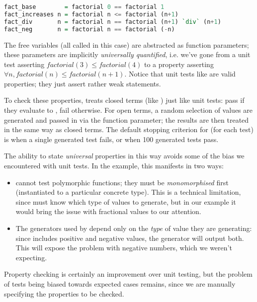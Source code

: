 \begin{lstlisting}[language=Haskell, xleftmargin=.2\textwidth, xrightmargin=.2\textwidth]
fact_base        = factorial 0 == factorial 1
fact_increases n = factorial n <= factorial (n+1)
fact_div       n = factorial n == factorial (n+1) `div` (n+1)
fact_neg       n = factorial n == factorial (-n)
\end{lstlisting}

The free variables (all called  in this case) are abstracted as function parameters; these parameters are implicitly \emph{universally quantified}, i.e. we've gone from a unit test asserting $factorial(3) \leq factorial(4)$ to a property asserting $\forall n, factorial(n) \leq factorial(n+1)$. Notice that unit tests like  are valid properties; they just assert rather weak statements.

To check these properties, \qcheck{} treats closed terms (like ) just like unit tests: pass if they evaluate to , fail otherwise. For open terms, a random selection of values are generated and passed in via the function parameter; the results are then treated in the same way as closed terms. The default stopping criterion for \qcheck{} (for each test) is when a single generated test fails, or when 100 generated tests pass.

The ability to state \emph{universal} properties in this way avoids some of the bias we encountered with unit tests. In the  example, this manifests in two ways:

\begin{itemize}
  \item \qcheck{} cannot test polymorphic functions; they must be \emph{monomorphised} first (instantiated to a particular concrete type). This is a technical limitation, since \qcheck{} must know which type of values to generate, but in our example it would bring the issue with fractional values to our attention.

  \item The generators used by \qcheck{} depend only on the \emph{type} of value they are generating: since  includes positive and negative values, the  generator will output both. This will expose the problem with negative numbers, which we weren't expecting.
\end{itemize}

Property checking is certainly an improvement over unit testing, but the problem of tests being biased towards expected cases remains, since we are manually specifying the properties to be checked.


